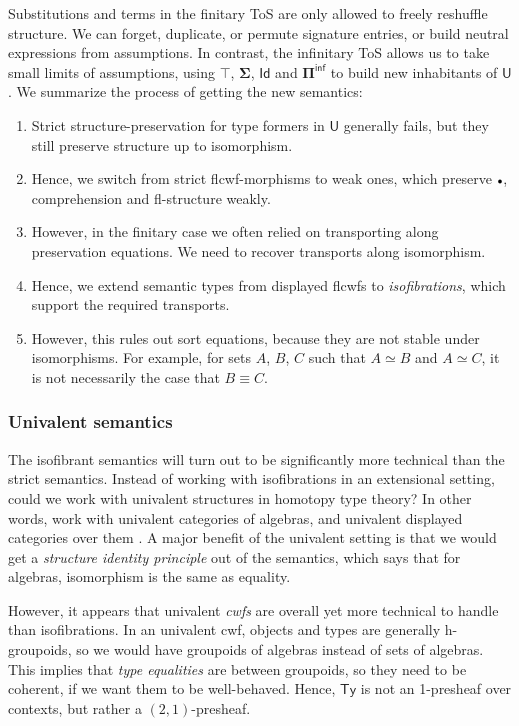 \documentclass[12pt,a4paper,twoside,openany]{book}
\theoremstyle{remark}
\theoremstyle{definition}
\theoremstyle{theorem}
\newcommand{\bs}[1]{\boldsymbol{#1}}
\newcommand{\Ty}{\mathsf{Ty}}
\newcommand{\U}{\mathsf{U}}
\newcommand{\Id}{\mathsf{Id}}
\newcommand{\emptycon}{\scaleobj{.75}\bullet}
\newcommand{\Piinf}{\Pi^{\mathsf{inf}}}
\newcommand{\bU}{\bs{\U}}
\begin{document}
Substitutions and terms in the finitary ToS are only allowed to freely reshuffle
structure. We can forget, duplicate, or permute signature entries, or build
neutral expressions from assumptions. In contrast, the infinitary ToS allows us
to take small limits of assumptions, using $\bs{\top}$, $\bs{\Sigma}$, $\bs{\Id}$ and $\bs{\Piinf}$
to build new inhabitants of $\bU$. We summarize the process of getting the new
semantics:
\begin{enumerate}
\item Strict structure-preservation for type formers in $\bU$ generally fails, but they still
      preserve structure up to isomorphism.
\item Hence, we switch from strict flcwf-morphisms to weak ones, which preserve $\emptycon$, comprehension
      and fl-structure weakly.
\item However, in the finitary case we often relied on transporting along
      preservation equations. We need to recover transports along isomorphism.
\item Hence, we extend semantic types from displayed flcwfs to \emph{isofibrations}, which
      support the required transports.
\item However, this rules out sort equations, because they are not stable under
      isomorphisms. For example, for sets $A$, $B$, $C$ such that $A \simeq B$ and
      $A \simeq C$, it is not necessarily the case that $B \equiv C$.
\end{enumerate}

\subsubsection{Univalent semantics}

The isofibrant semantics will turn out to be significantly more technical than
the strict semantics. Instead of working with isofibrations in an extensional
setting, could we work with univalent structures in homotopy type theory? In
other words, work with univalent categories of algebras, and univalent displayed
categories over them \cite{displayedcats}. A major benefit of the univalent
setting is that we would get a \emph{structure identity principle}
\cite{aczel2011voevodsky} out of the semantics, which says that for algebras,
isomorphism is the same as equality.

However, it appears that univalent \emph{cwfs} are overall yet more technical to
handle than isofibrations. In an univalent cwf, objects and types are generally
h-groupoids, so we would have groupoids of algebras instead of sets of
algebras. This implies that \emph{type equalities} are between groupoids, so
they need to be coherent, if we want them to be well-behaved. Hence, $\Ty$ is
not an 1-presheaf over contexts, but rather a $(2,1)$-presheaf.
\end{document}
